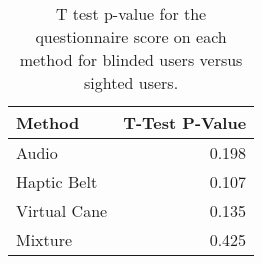 
\begin{table}[!htb]
\centering
\caption{T test p-value for the questionnaire score on each method for blinded users versus sighted users.}
\label{tab:ttest_questionnaires}
\begin{tabular}{lr}
\toprule
      Method &  T-Test P-Value \\
\midrule
       Audio &           0.198 \\
 Haptic Belt &           0.107 \\
Virtual Cane &           0.135 \\
     Mixture &           0.425 \\
\bottomrule
\end{tabular}
\end{table}

